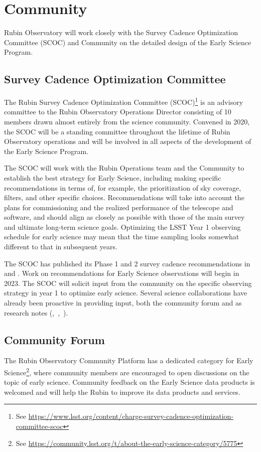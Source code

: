 \section{Community}
\label{sec:community}
Rubin Observatory will work closely with the Survey Cadence Optimization Committee (SCOC) and Community on the detailed design of the Early Science Program. 

\subsection{Survey Cadence Optimization Committee}
The Rubin Survey Cadence Optimization Committee (SCOC)\footnote{See \url{https://www.lsst.org/content/charge-survey-cadence-optimization-committee-scoc}} is an advisory committee to the Rubin Observatory Operations Director consisting of 10 members drawn almost entirely from the science community.
Convened in 2020, the SCOC will be a standing committee throughout the lifetime of Rubin Observatory operations and will be involved in all aspects of the development of the Early Science Program. 

The SCOC will work with the Rubin Operations team and the Community to establish the best strategy for Early Science, including making specific recommendations in terms of, for example, the prioritization of sky coverage, filters, and other specific choices. 
Recommendations will take into account the plans for commissioning and the realized performance of the telescope and software, and should align as closely as possible with those of the main survey and ultimate long-term science goals. 
Optimizing the LSST Year 1 observing schedule for early science may mean that the time sampling looks somewhat different to that in subsequent years. 

The SCOC has published its Phase 1 and 2 survey cadence recommendations in  and .
Work on recommendations for Early Science observations will begin in 2023.
The SCOC will solicit input from the community on the specific observing strategy in year 1 to optimize early science. 
Several science collaborations have already been proactive in providing input,  both the community forum and as research notes (\citep{2020arXiv201005926L},~\citep{Hambleton_2020},~\citep{Street_2020}).


\subsection{Community Forum}
\label{ssec:forum}
The Rubin Observatory Community Platform has a dedicated category for Early Science\footnote{See \url{https://community.lsst.org/t/about-the-early-science-category/5775}}, where community members are encouraged to open discussions on the topic of early science. 
Community feedback on the Early Science data products is welcomed and will help the Rubin to improve its data products and services. 
